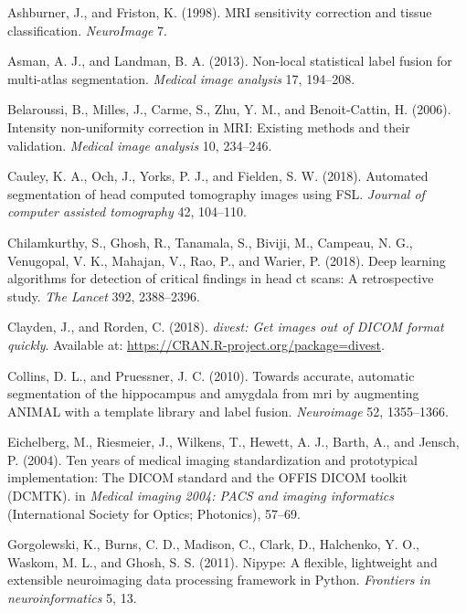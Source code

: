 \documentclass[utf8]{frontiersSCNS}
\begin{document}
\leavevmode\hypertarget{ref-ashburner1998mri}{}%
Ashburner, J., and Friston, K. (1998). MRI sensitivity correction and tissue classification. \emph{NeuroImage} 7.

\leavevmode\hypertarget{ref-asman2013non}{}%
Asman, A. J., and Landman, B. A. (2013). Non-local statistical label fusion for multi-atlas segmentation. \emph{Medical image analysis} 17, 194--208.

\leavevmode\hypertarget{ref-belaroussi2006intensity}{}%
Belaroussi, B., Milles, J., Carme, S., Zhu, Y. M., and Benoit-Cattin, H. (2006). Intensity non-uniformity correction in MRI: Existing methods and their validation. \emph{Medical image analysis} 10, 234--246.

\leavevmode\hypertarget{ref-biasct}{}%
Cauley, K. A., Och, J., Yorks, P. J., and Fielden, S. W. (2018). Automated segmentation of head computed tomography images using FSL. \emph{Journal of computer assisted tomography} 42, 104--110.

\leavevmode\hypertarget{ref-cq500}{}%
Chilamkurthy, S., Ghosh, R., Tanamala, S., Biviji, M., Campeau, N. G., Venugopal, V. K., Mahajan, V., Rao, P., and Warier, P. (2018). Deep learning algorithms for detection of critical findings in head ct scans: A retrospective study. \emph{The Lancet} 392, 2388--2396.

\leavevmode\hypertarget{ref-divest}{}%
Clayden, J., and Rorden, C. (2018). \emph{divest: Get images out of DICOM format quickly}. Available at: \url{https://CRAN.R-project.org/package=divest}.

\leavevmode\hypertarget{ref-collins2010towards}{}%
Collins, D. L., and Pruessner, J. C. (2010). Towards accurate, automatic segmentation of the hippocampus and amygdala from mri by augmenting ANIMAL with a template library and label fusion. \emph{Neuroimage} 52, 1355--1366.

\leavevmode\hypertarget{ref-dcmtk}{}%
Eichelberg, M., Riesmeier, J., Wilkens, T., Hewett, A. J., Barth, A., and Jensch, P. (2004). Ten years of medical imaging standardization and prototypical implementation: The DICOM standard and the OFFIS DICOM toolkit (DCMTK). in \emph{Medical imaging 2004: PACS and imaging informatics} (International Society for Optics; Photonics), 57--69.

\leavevmode\hypertarget{ref-nipype}{}%
Gorgolewski, K., Burns, C. D., Madison, C., Clark, D., Halchenko, Y. O., Waskom, M. L., and Ghosh, S. S. (2011). Nipype: A flexible, lightweight and extensible neuroimaging data processing framework in Python. \emph{Frontiers in neuroinformatics} 5, 13.
\end{document}
